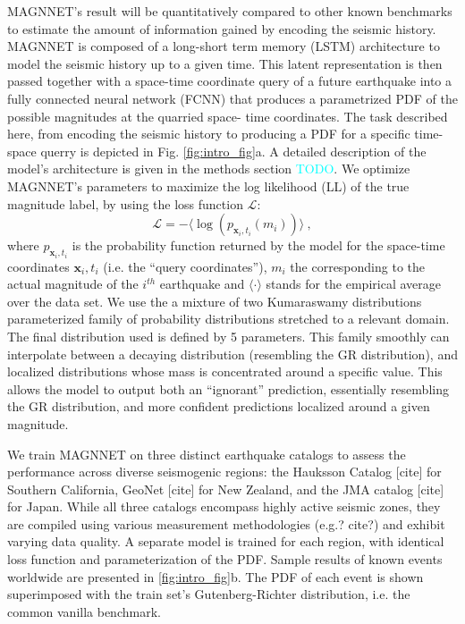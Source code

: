\documentclass[pdflatex]{sn-jnl}
\newcommand{\neri}[1]{{\textcolor{cyan}{#1}}}
\begin{document}
MAGNNET's result will be quantitatively compared to other known benchmarks to estimate the amount of information gained by encoding the seismic history.
MAGNNET is composed of a long-short term memory (LSTM) architecture to model the seismic history up to a given time. This latent representation is then passed together with  a space-time coordinate query of a future earthquake into a fully connected neural network (FCNN) that produces a parametrized PDF of the possible magnitudes at the quarried space- time coordinates. The task described here, from encoding the seismic history to producing a PDF for a specific time-space querry is depicted in Fig. \ref{fig:intro_fig}a. A detailed description of the model's architecture is given in the methods section \neri{TODO}. We optimize MAGNNET's parameters to maximize the log likelihood (LL) of the true magnitude label, by using the loss function $\mathcal{L}$:
\begin{equation}
    \mathcal{L} = -\langle \log{ \left( p_{\textbf{x}_i, t_i} \left( m_i \right) \right) } \rangle\ ,
    \label{eq:loss_function}
\end{equation}
where $p_{\textbf{x}_i, t_i}$ is the probability function returned by the model for the space-time coordinates $\textbf{x}_i, t_i$ (i.e. the ``query coordinates''), $m_i$ the corresponding to the actual magnitude of the $i^{th}$ earthquake and $\langle \cdot\rangle$ stands for the empirical average over the data set. We use the a mixture of two Kumaraswamy distributions \cite{kumaraswamy_generalized_1980} parameterized family of probability distributions stretched to a relevant domain. The final distribution used is defined by 5 parameters. This family smoothly can interpolate between a decaying distribution (resembling the GR distribution), and localized distributions whose mass is concentrated around a specific value. This allows the model to output both an ``ignorant'' prediction, essentially resembling the GR distribution, and more confident predictions localized around a given magnitude.

We train MAGNNET on three distinct earthquake catalogs to assess the performance across diverse seismogenic regions: the Hauksson Catalog [cite] for Southern California, GeoNet [cite] for New Zealand, and the JMA catalog [cite] for Japan. While all three catalogs encompass highly active seismic zones, they are compiled using various measurement methodologies (e.g.? cite?) and exhibit varying data quality. A separate model is trained for each region, with identical loss function and parameterization of the PDF. Sample results of known events worldwide are presented in \ref{fig:intro_fig}b. The PDF of each event is shown superimposed with the train set's Gutenberg-Richter distribution, i.e. the common vanilla benchmark.
\end{document}
